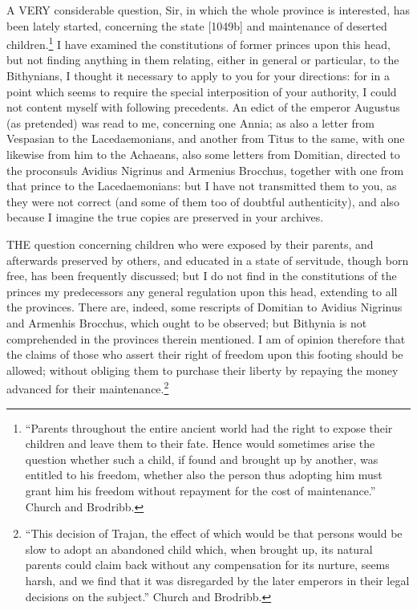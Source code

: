
A VERY considerable question, Sir, in which the whole province is
interested, has been lately started, concerning the state [1049b]
and maintenance of deserted children.\footnote{``Parents throughout
the entire ancient world had the right to expose their children and leave
them to their fate. Hence would sometimes arise the question whether such
a child, if found and brought up by another, was entitled to his freedom,
whether also the person thus adopting him must grant him his freedom
without repayment for the cost of maintenance.'' Church and Brodribb.} I have examined
the constitutions of former princes upon this head, but not finding
anything in them relating, either in general or particular, to the
Bithynians, I thought it necessary to apply to you for your directions:
for in a point which seems to require the special interposition of your
authority, I could not content myself with following precedents. An edict
of the emperor Augustus (as pretended) was read to me, concerning one
Annia; as also a letter from Vespasian to the Lacedaemonians, and another
from Titus to the same, with one likewise from him to the Achaeans, also
some letters from Domitian, directed to the proconsuls Avidius Nigrinus
and Armenius Brocchus, together with one from that prince to the
Lacedaemonians: but I have not transmitted them to you, as they were not
correct (and some of them too of doubtful authenticity), and also because
I imagine the true copies are preserved in your archives.


THE question concerning children who were exposed by their parents, and
afterwards preserved by others, and educated in a state of servitude,
though born free, has been frequently discussed; but I do not find in the
constitutions of the princes my predecessors any general regulation upon
this head, extending to all the provinces. There are, indeed, some
rescripts of Domitian to Avidius Nigrinus and Armenhis Brocchus, which
ought to be observed; but Bithynia is not comprehended in the provinces
therein mentioned. I am of opinion therefore that the claims of those who
assert their right of freedom upon this footing should be allowed; without
obliging them to purchase their liberty by repaying the money advanced for
their maintenance.\footnote{``This decision of
Trajan, the effect of which would be that persons would be slow to adopt
an abandoned child which, when brought up, its natural parents could
claim back without any compensation for its nurture, seems harsh, and we
find that it was disregarded by the later emperors in their legal
decisions on the subject.'' Church and Brodribb.}

